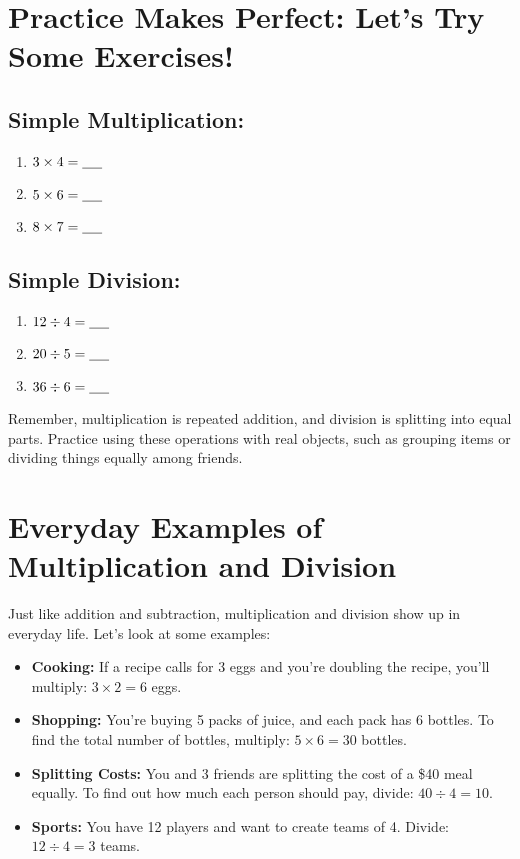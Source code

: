 \section{Practice Makes Perfect: Let’s Try Some Exercises!}
\begin{multicols}{2}
    \subsection{Simple Multiplication:}
    \begin{enumerate}
        \item $3 \times 4 = \underline{\hspace{0.5cm}}$
        \item $5 \times 6 = \underline{\hspace{0.5cm}}$
        \item $8 \times 7 = \underline{\hspace{0.5cm}}$
    \end{enumerate}

    \subsection{Simple Division:}
    \begin{enumerate}
        \item $12 \div 4 = \underline{\hspace{0.5cm}}$
        \item $20 \div 5 = \underline{\hspace{0.5cm}}$
        \item $36 \div 6 = \underline{\hspace{0.5cm}}$
    \end{enumerate}
\end{multicols}
Remember, multiplication is repeated addition, and division is splitting into equal parts. Practice using these operations with real objects, such as grouping items or dividing things equally among friends.

\section{Everyday Examples of Multiplication and Division}
Just like addition and subtraction, multiplication and division show up in everyday life. Let’s look at some examples:
\begin{itemize}
    \item \textbf{Cooking:} If a recipe calls for 3 eggs and you’re doubling the recipe, you’ll multiply: $3 \times 2 = 6$ eggs.
    \item \textbf{Shopping:} You’re buying 5 packs of juice, and each pack has 6 bottles. To find the total number of bottles, multiply: $5 \times 6 = 30$ bottles.
    \item \textbf{Splitting Costs:} You and 3 friends are splitting the cost of a \$40 meal equally. To find out how much each person should pay, divide: $40 \div 4 = 10$.
    \item \textbf{Sports:} You have 12 players and want to create teams of 4. Divide: $12 \div 4 = 3$ teams.
\end{itemize}

